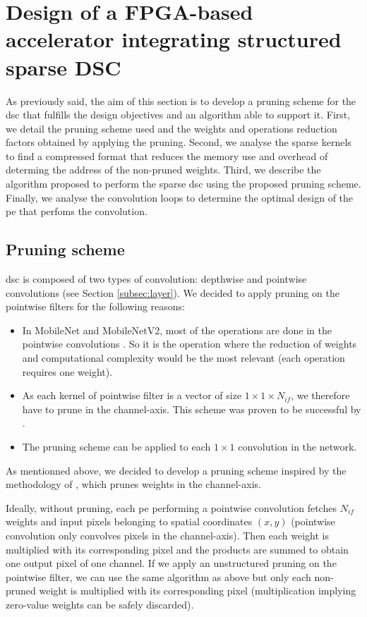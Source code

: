 \section{Design of a FPGA-based accelerator integrating structured sparse DSC} \label{sec:design}
%
As previously said,  the aim of this section is to develop a pruning scheme for the \acrshort{dsc} that fulfills the design objectives and an algorithm able to support it. First, we detail the pruning scheme used and the weights and operations reduction factors obtained by applying the pruning. Second, we analyse the sparse kernels to find a compressed format that reduces the memory use and overhead of determing the address of the non-pruned weights. Third, we describe the algorithm proposed to perform the sparse \acrshort{dsc} using the proposed pruning scheme. Finally, we analyse the convolution loops to determine the optimal design of the \acrshort{pe} that perfoms the convolution.
%
\subsection{Pruning scheme} \label{subsec:pscheme}
%
\acrshort{dsc} is composed of two types of convolution: depthwise and pointwise convolutions (see Section \ref{subsec:layer}). We decided to apply pruning on the pointwise filters for the following reasons:
%
\begin{itemize}
    \item In MobileNet and MobileNetV2, most of the operations are done in the pointwise convolutions \cite{zhang_channel_2019, tu_pruning_2019}. So it is the operation where the reduction of weights and computational complexity would be the most relevant (each operation requires one weight).
    \item As each kernel of pointwise filter is a vector of size $1 \times 1  \times N_{if}$, we therefore have to prune in the channel-axis. This scheme was proven to be successful by \textcite{kang_accelerator-aware_2020}.
    \item The pruning scheme can be applied to each $1 \times 1$ convolution in the network.
\end{itemize}
%
As mentionned above, we decided to develop a pruning scheme inspired by the methodology of \textcite{kang_accelerator-aware_2020}, which prunes weights in the channel-axis.

Ideally, without pruning, each \acrshort{pe} performing a pointwise convolution fetches $N_{if}$ weights and input pixels belonging to spatial coordinates $(x, y)$ (pointwise convolution only convolves pixels in the channel-axis). Then each weight is multiplied with its corresponding pixel and the products are summed to obtain one output pixel of one channel. If we apply an unstructured pruning on the pointwise filter, we can use the same algorithm as above but only each non-pruned weight is multiplied with its corresponding pixel (multiplication implying zero-value weights can be safely discarded).

